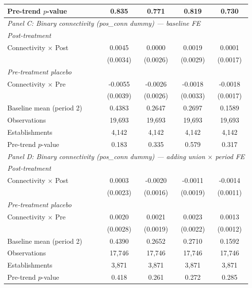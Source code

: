\begin{table}[H]
\begin{tabular}{lcccc}
Pre-trend $p$-value & 0.835 & 0.771 & 0.819 & 0.730 \\
\hline
\multicolumn{5}{l}{\textit{Panel C: Binary connectivity (pos\_conn dummy) — baseline FE}} \\
\multicolumn{5}{l}{\textit{Post-treatment}} \\
Connectivity $\times$ Post & 0.0045 & 0.0000 & 0.0019 & 0.0001 \\
 & (0.0034) & (0.0026) & (0.0029) & (0.0017) \\
\multicolumn{5}{l}{\textit{Pre-treatment placebo}} \\
Connectivity $\times$ Pre & -0.0055 & -0.0026 & -0.0018 & -0.0018 \\
 & (0.0039) & (0.0026) & (0.0033) & (0.0017) \\
\hline
Baseline mean (period 2) & 0.4383 & 0.2647 & 0.2697 & 0.1589 \\
Observations &       19,693 &       19,693 &       19,693 &       19,693 \\
Establishments &        4,142 &        4,142 &        4,142 &        4,142 \\
Pre-trend $p$-value & 0.183 & 0.335 & 0.579 & 0.317 \\
\hline
\multicolumn{5}{l}{\textit{Panel D: Binary connectivity (pos\_conn dummy) — adding union $\times$ period FE}} \\
\multicolumn{5}{l}{\textit{Post-treatment}} \\
Connectivity $\times$ Post & 0.0003 & -0.0020 & -0.0011 & -0.0014 \\
 & (0.0023) & (0.0016) & (0.0019) & (0.0011) \\
\multicolumn{5}{l}{\textit{Pre-treatment placebo}} \\
Connectivity $\times$ Pre & 0.0020 & 0.0021 & 0.0023 & 0.0013 \\
 & (0.0028) & (0.0019) & (0.0022) & (0.0012) \\
\hline
Baseline mean (period 2) & 0.4390 & 0.2652 & 0.2710 & 0.1592 \\
Observations &       17,746 &       17,746 &       17,746 &       17,746 \\
Establishments &        3,871 &        3,871 &        3,871 &        3,871 \\
Pre-trend $p$-value & 0.418 & 0.261 & 0.272 & 0.285 \\
\hline\hline
\end{tabular}
\begin{minipage}{\linewidth}
\smallskip

\end{minipage}
\end{table}
